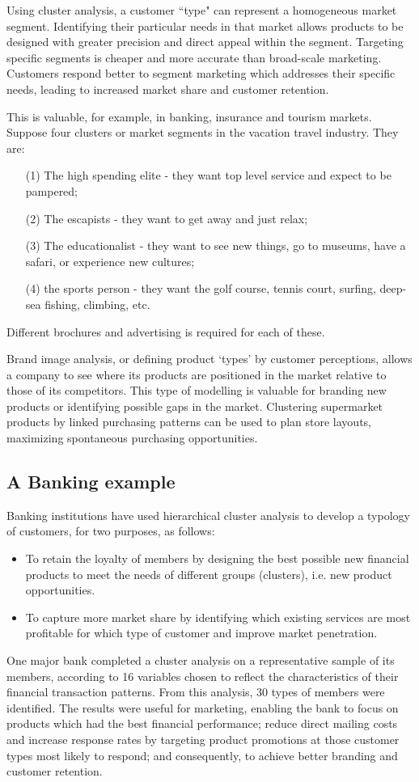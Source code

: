 Using cluster analysis, a customer ``type" can represent a homogeneous market segment.
Identifying their particular needs in that market allows products to be designed with greater
precision and direct appeal within the segment. Targeting specific segments is cheaper and
more accurate than broad-scale marketing. Customers respond better to segment marketing
which addresses their specific needs, leading to increased market share and customer
retention.

This is valuable, for example, in banking, insurance and tourism markets. Suppose
four clusters or market segments in the vacation travel industry. They are:
\begin{itemize}
\item[(1)] The high spending elite - they want top level service and expect to be pampered;
\item[(2)] The escapists - they want to get away and just relax;
\item[(3)] The educationalist - they want to see new things, go to museums,
have a safari, or experience new cultures;
\item[(4)] the sports person - they want the golf course, tennis court, surfing, deep-sea fishing, climbing, etc.
\end{itemize}
Different brochures and advertising is required for each of these.

Brand image analysis, or defining product `types' by customer perceptions, allows
a company to see where its products are positioned in the market relative to those of its
competitors. This type of modelling is valuable for branding new products or identifying
possible gaps in the market. Clustering supermarket products by linked purchasing patterns
can be used to plan store layouts, maximizing spontaneous purchasing opportunities.

\subsection{A Banking example}
Banking institutions have used hierarchical cluster analysis to develop a typology of customers, for two purposes, as follows:
\begin{itemize}
\item To retain the loyalty of members by designing the best possible new financial products to meet the needs of different groups (clusters), i.e. new product opportunities.
\item To capture more market share by identifying which existing services are most profitable for which type of customer and improve market penetration.
\end{itemize}
One major bank completed a cluster analysis on a representative sample of its members, according to 16 variables chosen to reflect the characteristics of their financial transaction patterns. From this analysis, 30 types of members were identified. The results were useful for marketing, enabling the bank to focus on products which had the best financial performance; reduce direct mailing costs and increase response rates by targeting product promotions at those customer types most likely to respond; and consequently, to achieve better branding and customer retention.

